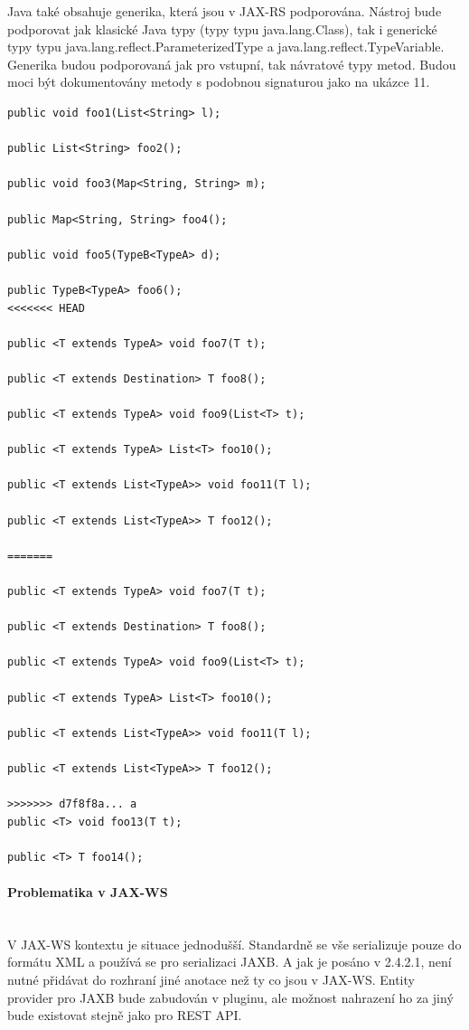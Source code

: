 \documentclass[11pt,twoside,a4paper]{book}
\begin{document}
Java také obsahuje generika, která jsou v JAX-RS podporována. Nástroj bude podporovat jak
klasické Java typy (typy typu java.lang.Class), tak i generické typy typu
java.lang.reflect.ParameterizedType a java.lang.reflect.TypeVariable. Generika
budou podporovaná jak pro vstupní, tak návratové typy metod. Budou moci být 
dokumentovány metody s podobnou signaturou jako na ukázce 11.

\begin{lstlisting}[frame=single, caption={Příklad podporovaných signatur
resource metod}, label={lst:signatury-metod}]
public void foo1(List<String> l);

public List<String> foo2();

public void foo3(Map<String, String> m);

public Map<String, String> foo4();

public void foo5(TypeB<TypeA> d);

public TypeB<TypeA> foo6();
<<<<<<< HEAD

public <T extends TypeA> void foo7(T t);

public <T extends Destination> T foo8();

public <T extends TypeA> void foo9(List<T> t);

public <T extends TypeA> List<T> foo10();

public <T extends List<TypeA>> void foo11(T l);

public <T extends List<TypeA>> T foo12();

=======

public <T extends TypeA> void foo7(T t);

public <T extends Destination> T foo8();

public <T extends TypeA> void foo9(List<T> t);

public <T extends TypeA> List<T> foo10();

public <T extends List<TypeA>> void foo11(T l);

public <T extends List<TypeA>> T foo12();

>>>>>>> d7f8f8a... a
public <T> void foo13(T t);

public <T> T foo14();
\end{lstlisting}

\paragraph{Problematika v JAX-WS}
\mbox{}\\

V JAX-WS kontextu je situace jednodušší. Standardně se vše serializuje pouze do formátu
XML a používá se pro serializaci JAXB. A jak je posáno v 2.4.2.1, není nutné přidávat do
rozhraní jiné anotace než ty co jsou v JAX-WS. Entity provider pro JAXB bude zabudován v
pluginu, ale možnost nahrazení ho za jiný bude existovat stejně jako pro REST API.
\end{document}
